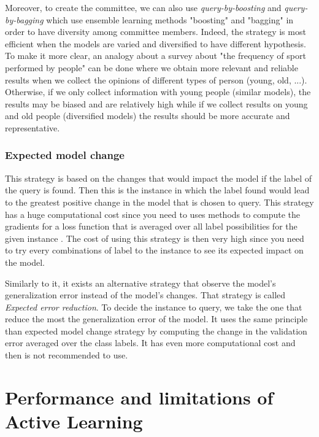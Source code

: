 \documentclass[11pt, openany]{report}
\theoremstyle{plain}
\theoremstyle{definition}
\theoremstyle{remark}
\begin{document}
Moreover, to create the committee, we can also use \textit{query-by-boosting} and \textit{query-by-bagging} which use ensemble learning methods "boosting" and "bagging" in order to have diversity among committee members. Indeed, the strategy is most efficient when the models are varied and diversified to have different hypothesis. To make it more clear, an analogy about a survey about "the frequency of sport performed by people" can be done where we obtain more relevant and reliable results when we collect the opinions of different types of person (young, old, ...). Otherwise, if we only collect information with young people (similar models), the results may be biased and are relatively high while if we collect results on young and old people (diversified models) the results should be more accurate and representative.       

\subsubsection{Expected model change}
This strategy is based on the changes that would impact the model if the label of the query is found. Then this is the instance in which the label found would lead to the greatest positive change in the model that is chosen to query. This strategy has a huge computational cost since you need to uses methods to compute the gradients for a loss function that is averaged over all label possibilities for the given instance \cite{AL-theory}. The cost of using this strategy is then very high since you need to try every combinations of label to the instance to see its expected impact on the model. 

Similarly to it, it exists an alternative strategy that observe the model's generalization error instead of the model's changes. That strategy is called \textit{Expected error reduction}. To decide the instance to query, we take the one that reduce the most the generalization error of the model. It uses the same principle than expected model change strategy by computing the change in the validation error averaged over the class labels. It has even more computational cost and then is not recommended to use. 

\section{Performance and limitations of Active Learning}
\end{document}
